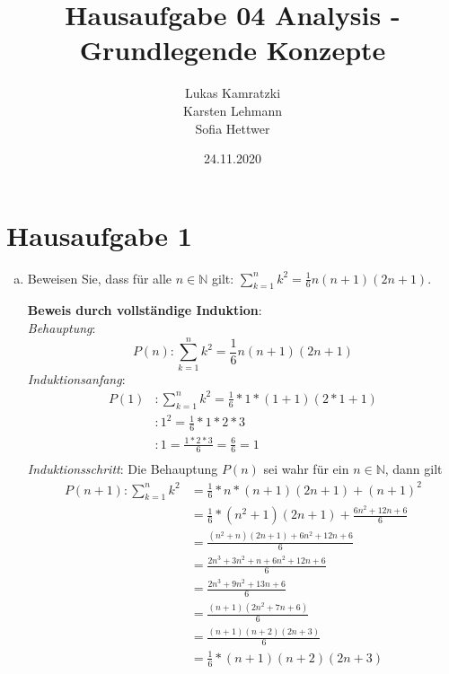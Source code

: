 \documentclass{article}
\author{Lukas Kamratzki \\ Karsten Lehmann \\ Sofia Hettwer}
\date{24.11.2020}
\title{Hausaufgabe 04 Analysis - Grundlegende Konzepte}
\begin{document}
\maketitle
\newpage

\section*{Hausaufgabe 1}

\begin{enumerate}[a)]
\item Beweisen Sie, dass für alle $n \in \mathbb{N}$ gilt:
  $\sum\limits_{k = 1}^n k^2 = \frac{1}{6} n (n + 1) (2n + 1)$.

  \textbf{Beweis durch vollständige Induktion}: \\
  \emph{Behauptung}:
  \[
    P(n) \colon \sum\limits_{k = 1}^n k^2 = \frac{1}{6} n (n + 1) (2n + 1)
  \]
  \emph{Induktionsanfang}: 
  \begin{align*}
    P(1) &\colon \sum\limits_{k = 1}^n k^2 = \frac{1}{6} * 1 * (1 + 1) (2 * 1 + 1) \\
         &\colon 1^2 = \frac{1}{6} * 1 * 2 * 3 \\
         &\colon 1 = \frac{1 * 2 * 3}{6} = \frac{6}{6} = 1 \\
  \end{align*}
  \emph{Induktionsschritt}: Die Behauptung $P(n)$ sei wahr für ein $n \in \mathbb{N}$,
  dann gilt \\
  \begin{align*}
    P(n + 1) \colon \sum\limits_{k = 1}^n k^2 &= \frac{1}{6} * n * (n + 1) (2n + 1) + (n + 1)^2 \\
                                              &= \frac{1}{6} * (n^2 + 1) (2n + 1) + \frac{6n^2 + 12n + 6}{6} \\
                                              &= \frac{(n^2 + n) (2n + 1) + 6n^2 + 12n + 6}{6} \\
                                              &= \frac{2n^3  + 3n^2 + n + 6n^2 + 12n + 6}{6} \\
                                              &= \frac{2n^3 + 9n^2 + 13n + 6}{6} \\
                                              &= \frac{(n + 1)(2n^2 + 7n + 6)}{6} \\
                                              &= \frac{(n + 1)(n + 2)(2n + 3)}{6} \\
                                              &= \frac{1}{6} * (n + 1) (n + 2) (2n + 3)\\
  \end{align*}


\end{enumerate}
\end{document}
